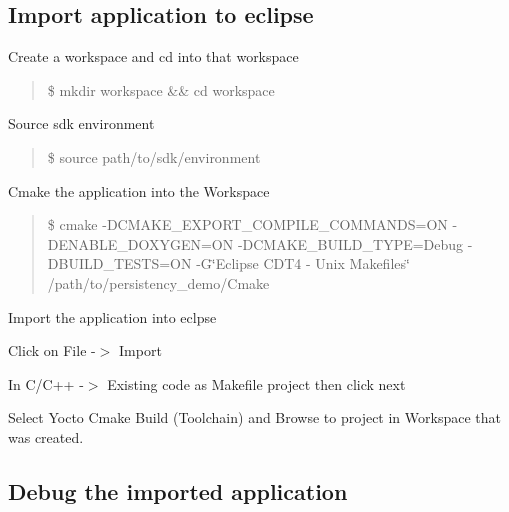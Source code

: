 \subsection*{Import application to eclipse}


\begin{DoxyItemize}
\item Create a workspace and cd into that workspace
\end{DoxyItemize}

\begin{quote}
\$ mkdir workspace \&\& cd workspace \end{quote}



\begin{DoxyItemize}
\item Source sdk environment ~\newline
 \begin{quote}
\$ source path/to/sdk/environment \end{quote}

\item Cmake the application into the Workspace
\end{DoxyItemize}

\begin{quote}
\$ cmake -\/\+D\+C\+M\+A\+K\+E\+\_\+\+E\+X\+P\+O\+R\+T\+\_\+\+C\+O\+M\+P\+I\+L\+E\+\_\+\+C\+O\+M\+M\+A\+N\+DS=ON -\/\+D\+E\+N\+A\+B\+L\+E\+\_\+\+D\+O\+X\+Y\+G\+EN=ON -\/\+D\+C\+M\+A\+K\+E\+\_\+\+B\+U\+I\+L\+D\+\_\+\+T\+Y\+PE=Debug -\/\+D\+B\+U\+I\+L\+D\+\_\+\+T\+E\+S\+TS=ON -\/G\char`\"{}\+Eclipse C\+D\+T4 -\/ Unix Makefiles\char`\"{} /path/to/persistency\+\_\+demo/\+Cmake \end{quote}



\begin{DoxyItemize}
\item Import the application into eclpse
\begin{DoxyItemize}
\item Click on File -\/$>$ Import
\item In C/\+C++ -\/$>$ Existing code as Makefile project then click next
\item Select Yocto Cmake Build (Toolchain) and Browse to project in Workspace that was created.
\end{DoxyItemize}
\end{DoxyItemize}

\subsection*{Debug the imported application}


